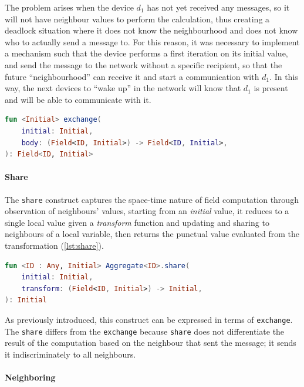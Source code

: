 The problem arises when the device $d_1$ has not yet received any messages, so it will not have neighbour values to perform
the calculation, thus creating a deadlock situation where it does not know the neighbourhood and does not know who to actually send a message to.
For this reason, it was necessary to implement a mechanism such that the device performs a first iteration on its initial value,
and send the message to the network without a specific recipient, so that the future ``neighbourhood'' can receive it and start a communication with $d_1$.
In this way, the next devices to ``wake up'' in the network will know that $d_1$ is present and will be able to communicate with it.

\begin{lstlisting}[language=kt,label={lst:exchange}, caption={The signature of the \texttt{exchange} function.}]
fun <Initial> exchange(
    initial: Initial,
    body: (Field<ID, Initial>) -> Field<ID, Initial>,
): Field<ID, Initial>
\end{lstlisting}

\paragraph{Share}
The \texttt{share} construct captures the space-time nature of field computation through observation of neighbours' values,
starting from an \emph{initial} value, it reduces to a single local value given a \emph{transform} function and updating and sharing to
neighbours of a local variable, then returns the punctual value evaluated from the transformation (\ref{lst:share}).

\begin{lstlisting}[language=kt,label={lst:share}, caption={The signature of the \texttt{share} function.}]
fun <ID : Any, Initial> Aggregate<ID>.share(
    initial: Initial,
    transform: (Field<ID, Initial>) -> Initial,
): Initial
\end{lstlisting}

As previously introduced, this construct can be expressed in terms of \texttt{exchange}.
The \texttt{share} differs from the \texttt{exchange} because  \texttt{share} does not differentiate the result of the
computation based on the neighbour that sent the message; it sends it indiscriminately to all neighbours.

\paragraph{Neighboring}

